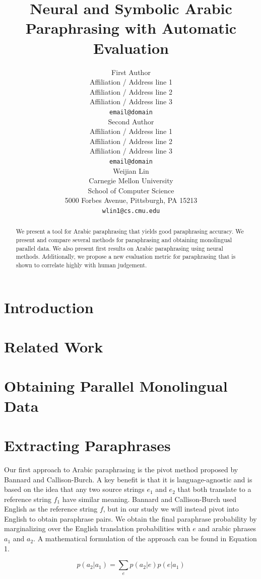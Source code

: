 \documentclass[11pt,letterpaper]{article}
\title{Neural and Symbolic Arabic Paraphrasing with Automatic Evaluation}
\author{First Author \\
  Affiliation / Address line 1 \\
  Affiliation / Address line 2 \\
  Affiliation / Address line 3 \\
  {\tt email@domain} \\\And
  Second Author \\
  Affiliation / Address line 1 \\
  Affiliation / Address line 2 \\
  Affiliation / Address line 3 \\
  {\tt email@domain} \\\And
  Weijian Lin \\
 Carnegie Mellon University\\
 School of Computer Science \\ 
 5000 Forbes Avenue, Pittsburgh, PA 15213 \\
  {\tt wlin1@cs.cmu.edu} \\}
\date{}
\begin{document}
\maketitle
\begin{abstract}

	We present a tool for Arabic paraphrasing that yields good paraphrasing accuracy.  We present and compare several methods for paraphrasing and obtaining monolingual parallel data. We also present first results on Arabic paraphrasing using neural methods. Additionally, we propose a new evaluation metric for paraphrasing that is shown to correlate highly with human judgement.
\end{abstract}


\section{Introduction}

\section{Related Work}

\section{Obtaining Parallel Monolingual Data}

\section{Extracting Paraphrases}
Our first approach to Arabic paraphrasing is the pivot method proposed by Bannard and Callison-Burch\cite{bannard2005bilingual}. A key benefit is that it is language-agnostic and is based on the idea that any two source strings $e_1$ and $e_2$ that both translate to a reference string $f_1$ have similar meaning. Bannard and Callison-Burch used English as the reference string $f$, but in our study we will instead pivot into English to obtain paraphrase pairs. We obtain the final paraphrase probability by marginalizing over the English translation probabilities with $e$ and arabic phrases $a_1$ and $a_2$. A mathematical formulation of the approach can be found in Equation 1.

\begin{equation}
p(a_2 | a_1) = \sum_{e} p(a_2 | e) p(e | a_1)
\end{equation}
\end{document}

